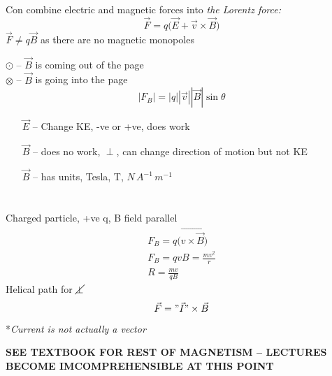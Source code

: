 \documentclass[a4paper, 11pt, fleqn, normalem]{report}
\begin{document}
Con combine electric and magnetic forces into \emph{the Lorentz force:}
\begin{equation*}
    \vec{F} = q \big( \vec{E} + \vec{v} \times \vec{B} \big)
\end{equation*}
$\vec{F} \neq q\vec{B}$ as there are no magnetic monopoles

$\odot$ -- $\vec{B}$ is coming out of the page \\
$\otimes$ -- $\vec{B}$ is going into the page
\begin{equation*}
    |F_{B}| = |q||\vec{v}||\vec{B}|\sin\theta
\end{equation*}
\begin{itemize}
    \item[$\vec{E}$ --] Change KE, -ve or +ve, does work
    \item[$\vec{B}$ --] does no work, $\perp$, can change direction of motion but not KE
    \item[$\vec{B}$ --] has units, Tesla, T, $N\,A^{-1}\,m^{-1}$
\end{itemize}

\chapter{}
Charged particle, +ve q, B field parallel
\begin{gather*}
    F_{B} = q\big(\vec{v \times \vec{B}} \big)\\
    F_{B} = qvB = \frac{mv^{2}}{r} \\
    R = \frac{mv}{qB}
\end{gather*}
Helical path for $\cancel{\perp}$
\begin{equation*}
    \vec{F} = "\vec{I}" \times \vec{B}
\end{equation*}
*\textit{Current is not actually a vector}

\textbf{SEE TEXTBOOK FOR REST OF MAGNETISM -- LECTURES BECOME IMCOMPREHENSIBLE AT THIS POINT}
\end{document}
